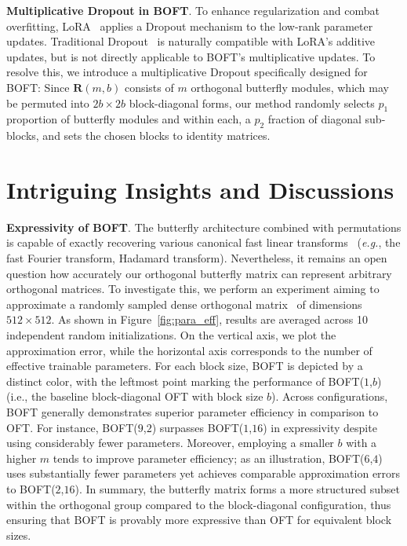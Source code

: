 \textbf{Multiplicative Dropout in BOFT}. To enhance regularization and combat overfitting, LoRA~\cite{hulora2022} applies a Dropout mechanism to the low-rank parameter updates. Traditional Dropout~\cite{srivastava2014dropout} is naturally compatible with LoRA's additive updates, but is not directly applicable to BOFT's multiplicative updates. To resolve this, we introduce a multiplicative Dropout specifically designed for BOFT: Since $\bm{R}(m,b)$ consists of $m$ orthogonal butterfly modules, which may be permuted into $2b\times 2b$ block-diagonal forms, our method randomly selects $p_1$ proportion of butterfly modules and within each, a $p_2$ fraction of diagonal sub-blocks, and sets the chosen blocks to identity matrices.

\section{Intriguing Insights and Discussions}

\textbf{Expressivity of BOFT}. The butterfly architecture combined with permutations is capable of exactly recovering various canonical fast linear transforms~\cite{dao2019learning,dao2019kaleidoscope} (\emph{e.g.}, the fast Fourier transform, Hadamard transform). Nevertheless, it remains an open question how accurately our orthogonal butterfly matrix can represent arbitrary orthogonal matrices. To investigate this, we perform an experiment aiming to approximate a randomly sampled dense orthogonal matrix~\cite{anderson1987generation} of dimensions $512\times 512$. As shown in Figure~\ref{fig:para_eff}, results are averaged across 10 independent random initializations. On the vertical axis, we plot the approximation error, while the horizontal axis corresponds to the number of effective trainable parameters. For each block size, BOFT is depicted by a distinct color, with the leftmost point marking the performance of BOFT($1$,$b$) (i.e., the baseline block-diagonal OFT with block size $b$). Across configurations, BOFT generally demonstrates superior parameter efficiency in comparison to OFT. For instance, BOFT($9$,$2$) surpasses BOFT($1$,$16$) in expressivity despite using considerably fewer parameters. Moreover, employing a smaller $b$ with a higher $m$ tends to improve parameter efficiency; as an illustration, BOFT($6$,$4$) uses substantially fewer parameters yet achieves comparable approximation errors to BOFT($2$,$16$). In summary, the butterfly matrix forms a more structured subset within the orthogonal group compared to the block-diagonal configuration, thus ensuring that BOFT is provably more expressive than OFT for equivalent block sizes.

